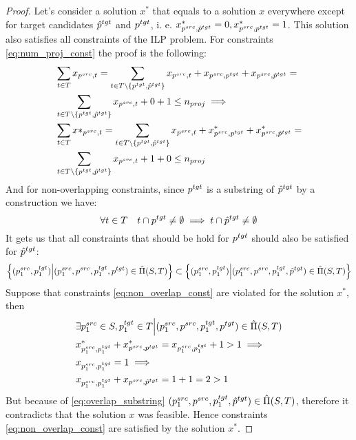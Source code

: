 \begin{proof}
    Let's consider a solution \( x^* \) that equals
    to a solution \( x \) everywhere except for target candidates \( \hat{p}^{tgt}  \) and \(  p^{tgt} \),
    i. e. \( x^*_{p^{src}, \hat{p}^{tgt}} = 0, x^*_{p^{src}, p^{tgt}} = 1 \). This solution also satisfies all constraints
    of the ILP problem. For constraints \eqref{eq:num_proj_const} the proof is the following:
    \begin{align*}
         & \sum\limits_{t \in T} x_{p^{src}, t} =
        \sum\limits_{t \in T \setminus \{ p^{tgt}, \hat{p}^{tgt} \}} x_{p^{src}, t} + x_{p^{src}, p^{tgt}} + x_{p^{src}, \hat{p}^{tgt}}  =     \\
         & \sum\limits_{t \in T \setminus \{ p^{tgt}, \hat{p}^{tgt} \}} x_{p^{src}, t} + 0 + 1
        \leq n_{proj} \implies                                                                                                                 \\
         & \sum\limits_{t \in T} x*_{p^{src}, t} =
        \sum\limits_{t \in T \setminus \{ p^{tgt}, \hat{p}^{tgt} \}} x_{p^{src}, t} + x^*_{p^{src}, p^{tgt}} + x^*_{p^{src}, \hat{p}^{tgt}}  = \\
         & \sum\limits_{t \in T \setminus \{ p^{tgt}, \hat{p}^{tgt} \}} x_{p^{src}, t} + 1 + 0 \leq n_{proj}
    \end{align*}
    And for non-overlapping constraints, since \( p^{tgt} \) is a substring of \( \hat{p}^{tgt} \) by a
    construction we have:
    \[
        \forall t \in T \quad t \cap p^{tgt} \neq \emptyset \implies t \cap \hat{p}^{tgt} \neq \emptyset
    \]
    It gets us that all constraints that should be hold for \( p^{tgt} \) should also be satisfied for \( \hat{p}^{tgt} \):
    \begin{equation} \label{eq:overlap_substring}
        \left\{ (p_1^{src}, p_1^{tgt}) \Big| (p_1^{src}, p^{src}, p_1^{tgt}, p^{tgt}) \in \hat{\Pi}(S, T) \right\} \subset
        \left\{ (p_1^{src}, p_1^{tgt}) \Big| (p_1^{src}, p^{src}, p_1^{tgt}, \hat{p}^{tgt}) \in \hat{\Pi}(S, T) \right\}
    \end{equation}
    Suppose that constraints \eqref{eq:non_overlap_const} are violated for the solution \( x^* \), then
    \begin{align*}
         & \exists p_1^{src} \in S, p_1^{tgt} \in T \Big| (p_1^{src}, p^{src}, p_1^{tgt}, p^{tgt}) \in \hat{\Pi}(S, T) \\
         & x^*_{p_1^{src}, p_1^{tgt}} + x^*_{p^{src}, p^{tgt}} =
        x_{p_1^{src}, p_1^{tgt}} + 1 > 1 \implies                                                                      \\
         & x_{p_1^{src}, p_1^{tgt}} = 1
        \implies                                                                                                       \\
         & x_{p_1^{src}, p_1^{tgt}} + x_{p^{src}, \hat{p}^{tgt}} = 1 + 1 = 2 > 1
    \end{align*}
    But because of \eqref{eq:overlap_substring}
    \( (p_1^{src}, p^{src}, p_1^{tgt}, \hat{p}^{tgt} ) \in \hat{\Pi}(S, T) \),
    therefore it contradicts that the solution \( x \) was feasible.
    Hence constraints \eqref{eq:non_overlap_const} are satisfied by the solution \( x^* \).


\end{proof}
